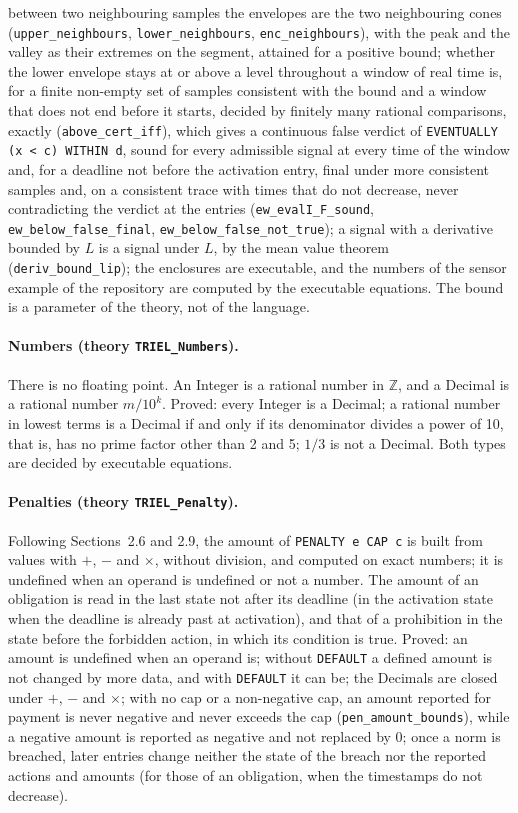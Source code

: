 \documentclass[11pt,a4paper]{article}
\begin{document}
between two neighbouring samples the envelopes are the two
neighbouring cones (\texttt{upper\_neighbours}, \texttt{lower\_neighbours},
\texttt{enc\_neighbours}), with the peak and the valley as their extremes on the
segment, attained for a positive bound; whether the lower envelope stays at or above a level throughout a window of
real time is, for a finite non-empty set of samples consistent with the bound and a
window that does not end before it starts, decided by finitely many rational
comparisons, exactly (\texttt{above\_cert\_iff}), which gives a continuous false verdict of
\texttt{EVENTUALLY (x < c) WITHIN d}, sound for every admissible signal at every time of
the window and, for a deadline not before the activation entry, final under more
consistent samples and, on a consistent trace with times that do not decrease, never
contradicting the verdict at the entries (\texttt{ew\_evalI\_F\_sound},
\texttt{ew\_below\_false\_final}, \texttt{ew\_below\_false\_not\_true}); a signal with a
derivative bounded by $L$ is a
signal under $L$, by the mean value theorem (\texttt{deriv\_bound\_lip}); the
enclosures are executable, and the numbers of the sensor example of the repository are
computed by the executable equations. The bound is a parameter of the theory, not of the
language.

\paragraph{Numbers (theory \texttt{TRIEL\_Numbers}).}
There is no floating point. An Integer is a rational number in $\mathbb{Z}$, and a Decimal
is a rational number $m / 10^k$. Proved: every Integer is a Decimal; a rational number in
lowest terms is a Decimal if and only if its denominator divides a power of 10, that is,
has no prime factor other than 2 and 5; $1/3$ is not a Decimal. Both types are decided by
executable equations.

\paragraph{Penalties (theory \texttt{TRIEL\_Penalty}).}
Following Sections~2.6 and 2.9, the amount of \texttt{PENALTY e CAP c} is built from
values with $+$, $-$ and $\times$, without division, and computed on exact numbers; it is
undefined when an operand is undefined or not a number. The amount of an obligation is
read in the last state not after its deadline (in the activation state when the deadline
is already past at activation), and that of a prohibition in the state
before the forbidden action, in which its condition is true. Proved: an amount is
undefined when an operand is; without \texttt{DEFAULT} a defined amount is not changed by
more data, and with \texttt{DEFAULT} it can be; the Decimals are closed under $+$, $-$
and $\times$; with no cap or a non-negative cap, an amount reported for payment is never
negative and never exceeds the cap (\texttt{pen\_amount\_bounds}), while a negative amount is
reported as negative and not replaced by 0; once a norm
is breached, later entries change neither the state of the breach nor the reported actions
and amounts (for those of an obligation, when the timestamps do not decrease).
\end{document}
